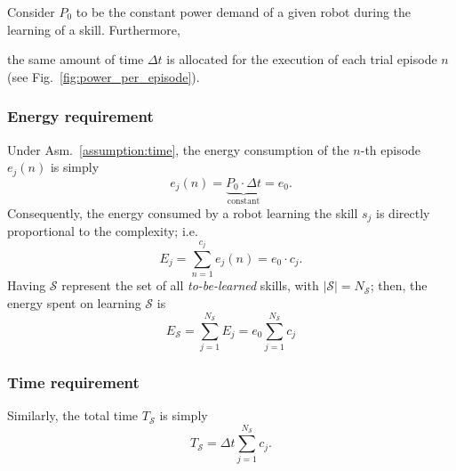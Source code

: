 Consider $P_0$ to be the constant power demand of a given robot during the learning of a skill. Furthermore,%
\begin{tcolorbox}
	\begin{assumption}\label{assumption:time}
		the same amount of time $\Delta t$ is allocated for the execution of each trial episode $n$ (see Fig.~\ref{fig:power_per_episode}).
	\end{assumption}
\end{tcolorbox}
\subsubsection{\textbf{Energy requirement}}
Under Asm.~\ref{assumption:time}, the energy consumption of the $n$-th episode $e_j(n)$ is simply
\begin{equation}\label{eq:energy_per_episode}
    e_j(n) = \underbrace{P_0\cdot \Delta t}_{\text{constant}} = e_0.
\end{equation}
Consequently, the energy consumed by a robot learning the skill $ s_j $ is directly proportional to the complexity; i.e.
\begin{equation}\label{eq:energy_per_skill}
    E_j =\sum_{n=1}^{c_j} e_j(n) = e_0 \cdot c_j.
\end{equation}
Having $\mathcal{S}$ represent the set of all \emph{to-be-learned} skills, with $|\mathcal{S}| = N_\mathcal{S}$; then, the energy spent on learning $\mathcal{S}$ is
\begin{equation}\label{eq:total_energy}
	E_{\mathcal{S}} = \sum_{j=1}^{{N_{\mathcal{S}}}} E_j = e_0 \sum_{j=1}^{{N_{\mathcal{S}}}} c_j%
\end{equation}
\subsubsection{\textbf{Time requirement}}
Similarly, the total time $T_{\mathcal{S}}$ is simply
\begin{equation}\label{eq:total_energy}
	T_{\mathcal{S}} = \Delta t \sum_{j=1}^{{N_{\mathcal{S}}}} c_j.
\end{equation}
